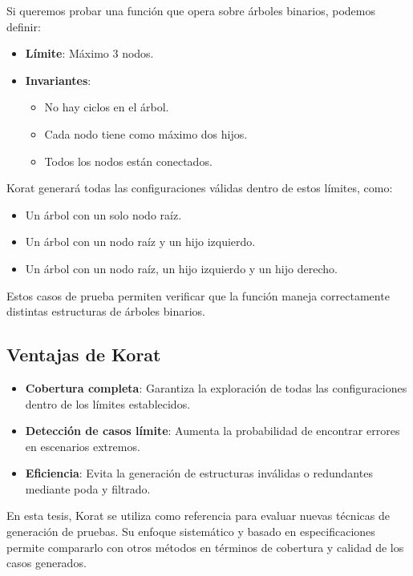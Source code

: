 Si queremos probar una función que opera sobre árboles binarios, podemos definir:

\begin{itemize}
    \item \textbf{Límite}: Máximo 3 nodos.
    \item \textbf{Invariantes}:
    \begin{itemize}
        \item No hay ciclos en el árbol.
        \item Cada nodo tiene como máximo dos hijos.
        \item Todos los nodos están conectados.
    \end{itemize}
\end{itemize}

Korat generará todas las configuraciones válidas dentro de estos límites, como:

\begin{itemize}
    \item Un árbol con un solo nodo raíz.
    \item Un árbol con un nodo raíz y un hijo izquierdo.
    \item Un árbol con un nodo raíz, un hijo izquierdo y un hijo derecho.
\end{itemize}

Estos casos de prueba permiten verificar que la función maneja correctamente distintas estructuras de árboles binarios.

\subsection{Ventajas de Korat}

\begin{itemize}
    \item \textbf{Cobertura completa}: Garantiza la exploración de todas las configuraciones dentro de los límites establecidos.
    \item \textbf{Detección de casos límite}: Aumenta la probabilidad de encontrar errores en escenarios extremos.
    \item \textbf{Eficiencia}: Evita la generación de estructuras inválidas o redundantes mediante poda y filtrado.
\end{itemize}

En esta tesis, Korat se utiliza como referencia para evaluar nuevas técnicas de generación de pruebas. Su enfoque sistemático y basado en especificaciones permite compararlo con otros métodos en términos de cobertura y calidad de los casos generados.





